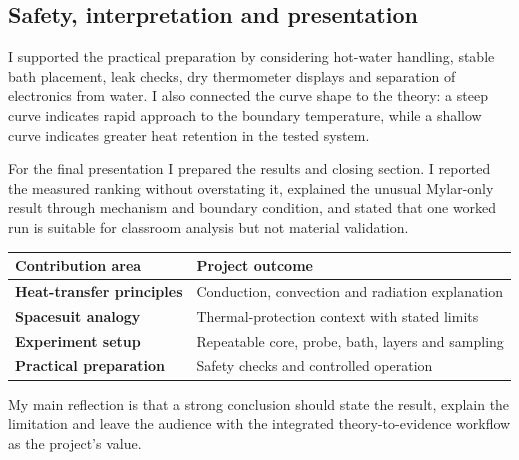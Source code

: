 \documentclass[9pt,a4paper]{extarticle}
\begin{document}
\subsection*{Safety, interpretation and presentation}
I supported the practical preparation by considering hot-water handling, stable bath placement, leak checks, dry thermometer displays and separation of electronics from water. I also connected the curve shape to the theory: a steep curve indicates rapid approach to the boundary temperature, while a shallow curve indicates greater heat retention in the tested system.

For the final presentation I prepared the results and closing section. I reported the measured ranking without overstating it, explained the unusual Mylar-only result through mechanism and boundary condition, and stated that one worked run is suitable for classroom analysis but not material validation.

\begin{center}\small
\begin{tabularx}{0.86\textwidth}{@{}>{\bfseries}p{}X@{}}
\toprule
Contribution area & Project outcome \\
\midrule
Heat-transfer principles & Conduction, convection and radiation explanation \\
Spacesuit analogy & Thermal-protection context with stated limits \\
Experiment setup & Repeatable core, probe, bath, layers and sampling \\
Practical preparation & Safety checks and controlled operation \\
\bottomrule
\end{tabularx}
\end{center}

My main reflection is that a strong conclusion should state the result, explain the limitation and leave the audience with the integrated theory-to-evidence workflow as the project's value.
\end{document}
